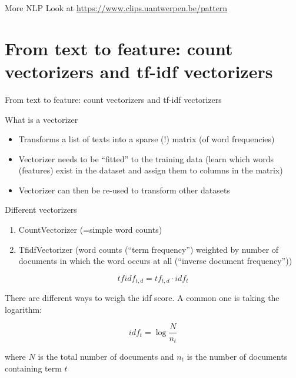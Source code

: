 \documentclass{beamer}
\begin{document}
\begin{frame}{More NLP}
\Huge{Look at \url{https://www.clips.uantwerpen.be/pattern}}
\end{frame}






	
\section{From text to feature: count vectorizers and tf-idf vectorizers}
\begin{frame}[plain]
From text to feature: count vectorizers and tf-idf vectorizers
\end{frame}	



\begin{frame}{What is a vectorizer}
\begin{itemize}[<+->]
	\item Transforms a list of texts into a sparse (!) matrix (of word frequencies)
	\item Vectorizer needs to be ``fitted'' to the training data (learn which words (features) exist in the dataset and assign them to columns in the matrix)
	\item Vectorizer can then be re-used to transform other datasets 
\end{itemize}
\end{frame}


\begin{frame}{Different vectorizers}
\begin{enumerate}[<+->]
	\item CountVectorizer (=simple word counts)
	\item TfidfVectorizer (word counts (``term frequency'') weighted by number of documents in which the word occurs at all (``inverse document frequency''))
\end{enumerate}

\pause
$$tfidf_{t,d} = tf_{t,d} \cdot idf_{t}$$

There are different ways to weigh the idf score. A common one is taking the logarithm:

$$idf_{t} = \log \frac{N}{n_t}$$

where $N$ is the total number of documents and $n_t$ is the number of documents containing term $t$
\end{frame}
\end{document}
